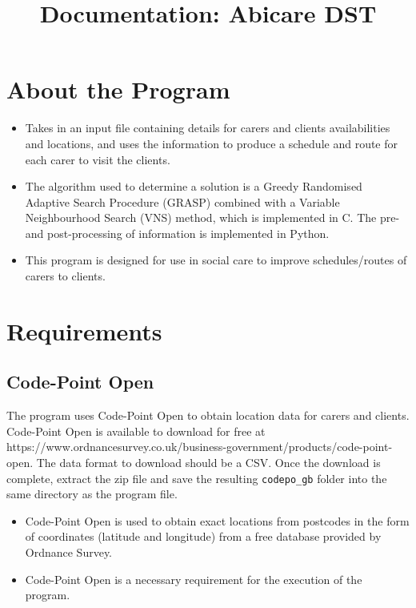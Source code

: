 \documentclass[a4paper]{article}
\begin{document}
\title{\vspace{-20mm}Documentation: Abicare DST\vspace{-15mm}}
\date{}
\maketitle

\section{About the Program}
\begin{itemize}[leftmargin=*]
	\item Takes in an input file containing details for carers and clients availabilities and locations, and uses the information to produce a schedule and route for each carer to visit the clients.
	\item The algorithm used to determine a solution is a Greedy Randomised Adaptive Search Procedure (GRASP) combined with a Variable Neighbourhood Search (VNS) method, which is implemented in C. The pre- and post-processing of information is implemented in Python.
	\item This program is designed for use in social care to improve schedules/routes of carers to clients.
\end{itemize}

\section{Requirements}
\subsection{Code-Point Open}
The program uses Code-Point Open to obtain location data for carers and clients. Code-Point Open is available to download for free at https://www.ordnancesurvey.co.uk/business-government/products/code-point-open. The data format to download should be a CSV. Once the download is complete, extract the zip file and save the resulting \texttt{codepo\_gb} folder into the same directory as the program file.
\begin{itemize}[leftmargin=*]
	\item Code-Point Open is used to obtain exact locations from postcodes in the form of coordinates (latitude and longitude) from a free database provided by Ordnance Survey.
	\item Code-Point Open is a necessary requirement for the execution of the program.
\end{itemize}
\end{document}
